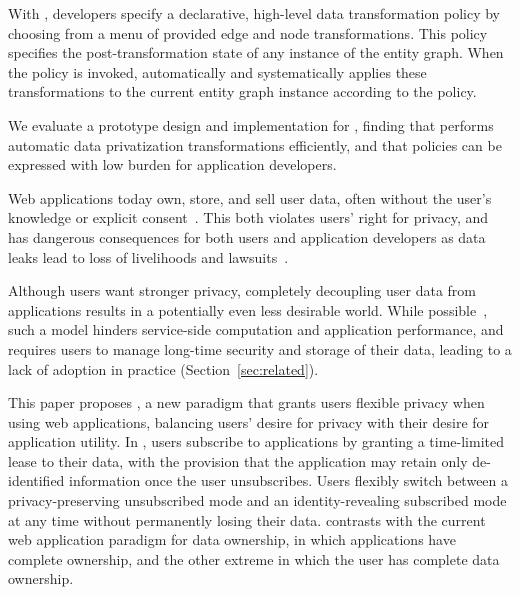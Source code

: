 With \sys, developers specify a declarative, high-level data transformation policy by choosing from
a menu of provided edge and node transformations. This policy specifies the post-transformation
state of any instance of the entity graph. When the policy is invoked, \sys automatically and
systematically applies these transformations to the current entity graph instance according to the
policy.

We evaluate a prototype design and implementation for \sys, finding that \sys performs automatic
data privatization transformations efficiently, and that policies can be expressed with low burden for
application developers.

\iffalse
%
%
Web applications today own, store, and sell user data, often without the user's knowledge or
explicit consent~\cite{nytimes:fb, npr:data}. This both violates users' right for privacy, and has
dangerous consequences for both users and application developers as data leaks lead to loss of
livelihoods and lawsuits~\cite{breach:amazon,breach:twitter, breach:fb, breach:marriott,
breach:quora}. 

Although users want stronger privacy, completely decoupling user data from applications results in a
potentially even less desirable world. While possible~\cite{solid, amber, w5, blockstack, bstore}, such a
model hinders service-side computation and application performance, and requires users to manage
long-time security and storage of their data, leading to a lack of adoption in practice (Section~\ref{sec:related}).  

This paper proposes \name, a new paradigm that grants users flexible privacy when using web
applications, balancing users' desire for privacy with their desire for application utility. In
\name, users subscribe to applications by granting a time-limited lease to their data, with the
provision that the application may retain only de-identified information once the user unsubscribes.
Users flexibly switch between a privacy-preserving unsubscribed mode and an identity-revealing
subscribed mode at any time without permanently losing their data. \name contrasts
with the current web application paradigm for data ownership, in which applications have complete
ownership, and the other extreme in which the user has complete data ownership.%

